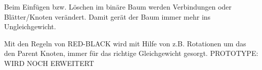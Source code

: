 Beim Einfügen bzw. Löschen im binäre Baum werden Verbindungen oder Blätter/Knoten verändert. Damit gerät der Baum immer mehr ins Ungleichgewicht. 

Mit den Regeln von RED-BLACK wird mit Hilfe von z.B. Rotationen um das den Parent Knoten, immer für das richtige Gleichgewicht gesorgt.
\newline
\newline
\newline
PROTOTYPE: WIRD NOCH ERWEITERT
\newline
\newline
\newline